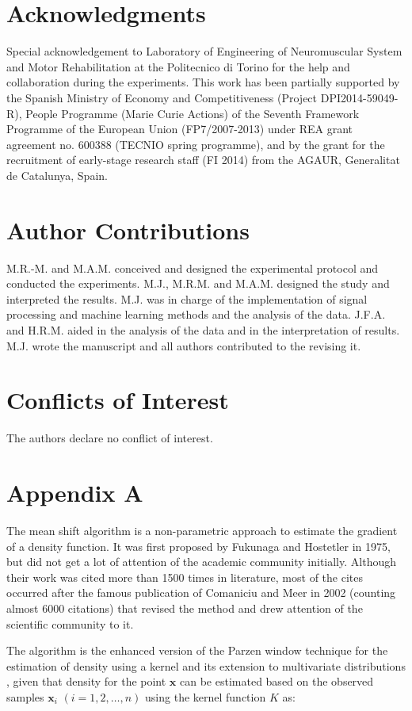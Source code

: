 \section{Acknowledgments}
Special acknowledgement to Laboratory of Engineering of Neuromuscular System and Motor Rehabilitation at the Politecnico di Torino for the help and collaboration during the experiments. This work has been partially supported by the Spanish Ministry of Economy and Competitiveness (Project DPI2014-59049-R), People Programme (Marie Curie Actions) of the Seventh Framework Programme of the European Union (FP7/2007-2013) under REA grant agreement no. 600388 (TECNIO spring programme), and by the grant for the recruitment of early-stage research staff (FI 2014) from the AGAUR, Generalitat de Catalunya, Spain.


\section{Author Contributions}
M.R.-M. and M.A.M. conceived and designed the experimental protocol and conducted the experiments. M.J., M.R.M. and M.A.M. designed the study and interpreted the results. M.J. was in charge of the implementation of signal processing and machine learning methods and the analysis of the data. J.F.A. and H.R.M. aided in the analysis of the data and in the interpretation of results. M.J. wrote the manuscript and all authors contributed to the revising it.

\section{Conflicts of Interest}
The authors declare no conflict of interest.
\clearpage

\section{Appendix A}
The mean shift algorithm is a non-parametric approach to estimate the gradient of a density function. It was first proposed by Fukunaga and Hostetler \citep{Fukunaga1975} in 1975, but did not get a lot of attention of the academic community initially. Although their work was cited more than 1500 times in literature, most of the cites occurred after the famous publication of Comaniciu and Meer \citep{Comaniciu2002} in 2002 (counting almost 6000 citations) that revised the method and drew attention of the scientific community to it.

The algorithm is the enhanced version of the Parzen window technique for the estimation of density using a kernel \citep{Parzen1962} and its extension to multivariate distributions \citep{Cacoullos1966}, given that density for the point $\textbf{x}$ can be estimated based on the observed samples $\textbf{x}_i$ $(i = 1,2,…,n)$ using the kernel function $K$ as:

